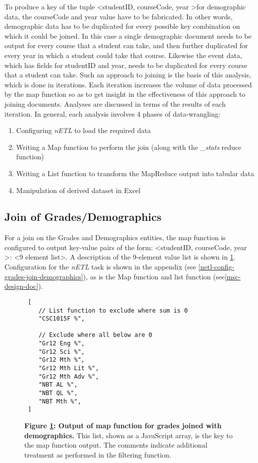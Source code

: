 To produce a key of the tuple \textless studentID, courseCode, year \textgreater for demographic data, the courseCode and year value have to be fabricated. In other words, demographic data has to be duplicated for every possible key combination on which it could be joined. In this case a single demographic document needs to be output for every course that a student can take, and then further duplicated for every year in which a student could take that course. Likewise the event data, which has fields for studentID and year, needs to be duplicated for every course that a student can take. Such an approach to joining is the basis of this analysis, which is done in iterations. Each iteration increases the volume of data processed by the map function so as to get insight in the effectiveness of this approach to joining documents. Analyses are discussed in terms of the results of each iteration. In general, each analysis involves 4 phases of data-wrangling:

\begin{enumerate}
    \item Configuring \textit{nETL} to load the required data
    \item Writing a Map function to perform the join (along with the \textit{\_stats} reduce function)
    \item Writing a List function to transform the MapReduce output into tabular data
    \item Manipulation of derived dataset in Excel
\end{enumerate}

\subsection{Join of Grades/Demographics}
For a join on the Grades and Demographics entities, the map function is configured to output key-value pairs of the form: \textless studentID, courseCode, year \textgreater : <9 element list>. A description of the 9-element value list is shown in \ref{grades-join-demographics-output}. Configuration for the \textit{nETL} task is shown in the appendix (see \ref{netl-config-grades-join-demographics}), as is the Map function and list function (see\ref{msc-design-doc}).

\begin{figure}[ht]
    \centering
    \begin{verbatim}
 [
    // List function to exclude where sum is 0
    "CSC1015F %",

    // Exclude where all below are 0 
    "Gr12 Eng %", 
    "Gr12 Sci %",
    "Gr12 Mth %",
    "Gr12 Mth Lit %",
    "Gr12 Mth Adv %",
    "NBT AL %",
    "NBT QL %",
    "NBT Mth %",
 ]    
    \end{verbatim}
    \caption[Analysis 1: Grades joined with Demographics]{\textbf{Figure \ref{grades-join-demographics-output}: Output of map function for grades joined with demographics.} This list, shown as a JavaScript array, is the key to the map function output. The comments indicate additional treatment as performed in the filtering function.}
    \label{grades-join-demographics-output}
\end{figure}


